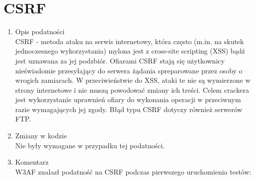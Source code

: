 
\section{CSRF}
\begin{enumerate}
\item Opis podatności\\
CSRF - metoda ataku na serwis internetowy, która często (m.in. na skutek jednoczesnego wykorzystania) mylona jest z cross-site scripting (XSS) bądź jest uznawana za jej podzbiór. Ofiarami CSRF stają się użytkownicy nieświadomie przesyłający do serwera żądania spreparowane przez osoby o wrogich zamiarach. W przeciwieństwie do XSS, ataki te nie są wymierzone w strony internetowe i nie muszą powodować zmiany ich treści. Celem crackera jest wykorzystanie uprawnień ofiary do wykonania operacji w przeciwnym razie wymagających jej zgody. Błąd typu CSRF dotyczy również serwerów FTP. 
\item Zmiany w kodzie\\
Nie były wymagane w przypadku tej podatności.
\item Komentarz\\
W3AF znalazł podatność na CSRF podczas pierwszego uruchomienia testów:
\noindent
\begin{minipage}{\linewidth}
\label{erd}
\end{minipage}
\end{enumerate}



